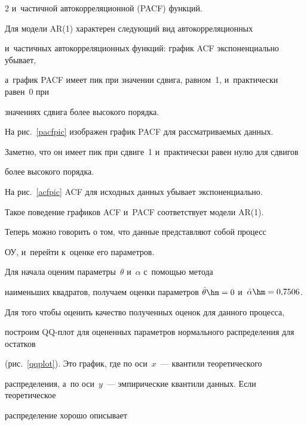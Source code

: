 \begin{multicols}{2}
и~частичной автокорреляционной (PACF) функций.





         Для модели AR(1) характерен следующий вид автокорреляционных 


         и~частичных автокорреляционных функций: график ACF экспоненциально убывает, 


         а~график PACF имеет пик при значении сдвига, равном~1, и~практически равен~0 при 


значениях сдвига более высокого порядка.





       


       На рис.~\ref{pacfpic} изображен график PACF для рас\-смат\-ри\-ва\-емых данных. 


Заметно, что он имеет пик при сдвиге~1 и~практически равен нулю для сдвигов 


более высокого порядка.


        На рис.~\ref{acfpic} ACF для исходных данных убывает экспоненциально.


        Такое поведение графиков ACF и~PACF соответствует модели AR(1).





        Теперь можно говорить о том, что данные представляют собой процесс 


ОУ, и~перейти к~оценке его параметров.





        Для начала оценим параметры~$\theta$ и~$\alpha$ с~по\-мощью метода 


наименьших квадратов, получаем оценки параметров $\hat \theta \hm= 0$ и~$\hat \alpha 


\hm= 0{,}7506$.








        Для того чтобы оценить качество полученных оценок для данного процесса, 


построим QQ-плот для оцененных параметров нормального распределения для остатков 


(рис.~\ref{qqplot}). Это график, где по оси~$x$~--- квантили теоретического 


распределения, а~по оси~$y$~--- эмпирические квантили данных. Если теоретическое 


распределение хорошо описывает\linebreak\vspace*{-12pt}





\pagebreak





\end{multicols}





